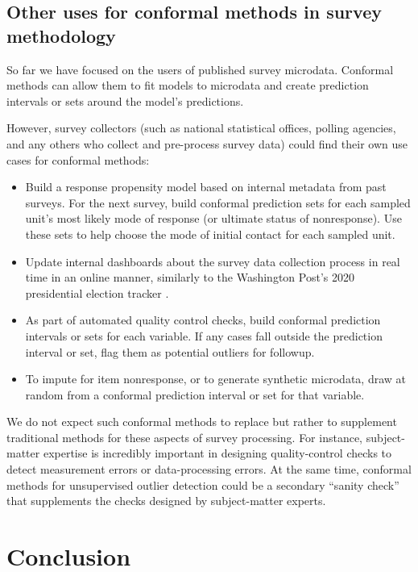 \documentclass[10.5pt, letterpaper]{article}
\numberwithin{table}{section}
\numberwithin{figure}{section}
\numberwithin{equation}{section}
\begin{document}
\subsection{Other uses for conformal methods in survey methodology}

So far we have focused on the users of published survey microdata. Conformal methods can allow them to fit models to microdata and create prediction intervals or sets around the model's predictions.

However, survey collectors (such as national statistical offices, polling agencies, and any others who collect and pre-process survey data) could find their own use cases for conformal methods:

\begin{itemize}
  \item Build a response propensity model based on internal metadata from past surveys. For the next survey, build conformal prediction sets for each sampled unit's most likely mode of response (or ultimate status of nonresponse). Use these sets to help choose the mode of initial contact for each sampled unit.
  \item Update internal dashboards about the survey data collection process in real time in an online manner, similarly to the Washington Post's 2020 presidential election tracker \citep{cherian2020washington}.
  \item As part of automated quality control checks, build conformal prediction intervals or sets for each variable. If any cases fall outside the prediction interval or set, flag them as potential outliers for followup.
  \item To impute for item nonresponse, or to generate synthetic microdata, draw at random from a conformal prediction interval or set for that variable.
\end{itemize}

We do not expect such conformal methods to replace but rather to supplement traditional methods for these aspects of survey processing. For instance, subject-matter expertise is incredibly important in designing quality-control checks to detect measurement errors or data-processing errors. At the same time, conformal methods for unsupervised outlier detection could be a secondary ``sanity check'' that supplements the checks designed by subject-matter experts.



\section{Conclusion}\label{sec:Conclusion}
\end{document}

